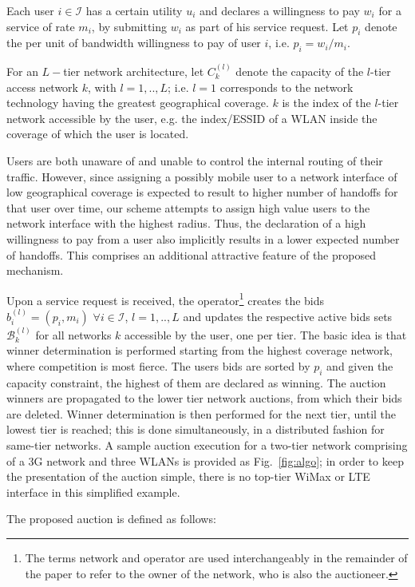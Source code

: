 \documentclass[a4paper]{article}
\begin{document}
Each user $i \in \mathcal{I}$ has a certain utility $u_i$ 
and declares a willingness to pay $w_i$ for a service of rate $m_i$, by 
submitting $w_i$ as part of his service request. Let $p_i$ denote the per unit 
of bandwidth willingness to pay of user $i$, i.e. $p_i = w_i / m_i$.

For an $L-$tier network architecture, let $C_k^{(l)}$ denote the capacity of 
the $l$-tier access network $k$, with $l = {1,..,L}$; i.e. $l=1$
corresponds to the network technology having the greatest geographical coverage. 
$k$ is the index of the $l$-tier network accessible by the user, e.g. the 
index/ESSID of a WLAN inside the coverage of which the user is located. 

Users are both unaware of and unable to control the internal routing of 
their traffic. However, since assigning a possibly mobile user to a network 
interface of low geographical coverage is expected to result to higher number 
of handoffs for that user over time, our scheme
attempts to assign high value users to the network interface with the highest radius.
Thus, the declaration of a high willingness to pay from a user also implicitly results 
in a lower expected number of handoffs. This comprises an additional attractive feature of 
the proposed mechanism.

Upon a service request is received, the operator\footnote{The terms network and operator
are used interchangeably in the remainder of the paper to refer to the owner of the network, who is also the auctioneer.} creates the bids 
$b_i^{(l)} = (p_i, m_i)$ $\forall i \in \mathcal{I}$, $l=1,..,L$ and updates the 
respective active bids sets $\mathcal{B}_k^{(l)}$ for all networks $k$
accessible by the user, one per tier. 
The basic idea is that winner determination is performed starting from
the highest coverage network, where competition is most fierce. The 
users bids are sorted by $p_i$ and given the capacity constraint, the 
highest of them are declared as winning. The auction winners are propagated to the
lower tier network auctions, from which their bids are deleted. Winner determination is 
then performed for the next tier, until the lowest tier is reached; this is done
simultaneously, in a distributed fashion for same-tier networks.
A sample auction execution for a two-tier network comprising of a 3G network
and three WLANs is provided as Fig.~\ref{fig:algo}; in order to keep the
presentation of the auction simple,
there is no
top-tier WiMax or LTE interface in this simplified example.

The proposed auction is defined as follows:
\end{document}

